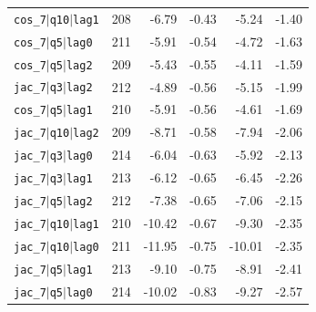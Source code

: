 \begin{longtable}{lrrrrr}
\texttt{cos\_7$\mid$q10$\mid$lag1} & 208 & -6.79 & -0.43 & -5.24 & -1.40 \\
\texttt{cos\_7$\mid$q5$\mid$lag0} & 211 & -5.91 & -0.54 & -4.72 & -1.63 \\
\texttt{cos\_7$\mid$q5$\mid$lag2} & 209 & -5.43 & -0.55 & -4.11 & -1.59 \\
\texttt{jac\_7$\mid$q3$\mid$lag2} & 212 & -4.89 & -0.56 & -5.15 & -1.99 \\
\texttt{cos\_7$\mid$q5$\mid$lag1} & 210 & -5.91 & -0.56 & -4.61 & -1.69 \\
\texttt{jac\_7$\mid$q10$\mid$lag2} & 209 & -8.71 & -0.58 & -7.94 & -2.06 \\
\texttt{jac\_7$\mid$q3$\mid$lag0} & 214 & -6.04 & -0.63 & -5.92 & -2.13 \\
\texttt{jac\_7$\mid$q3$\mid$lag1} & 213 & -6.12 & -0.65 & -6.45 & -2.26 \\
\texttt{jac\_7$\mid$q5$\mid$lag2} & 212 & -7.38 & -0.65 & -7.06 & -2.15 \\
\texttt{jac\_7$\mid$q10$\mid$lag1} & 210 & -10.42 & -0.67 & -9.30 & -2.35 \\
\texttt{jac\_7$\mid$q10$\mid$lag0} & 211 & -11.95 & -0.75 & -10.01 & -2.35 \\
\texttt{jac\_7$\mid$q5$\mid$lag1} & 213 & -9.10 & -0.75 & -8.91 & -2.41 \\
\texttt{jac\_7$\mid$q5$\mid$lag0} & 214 & -10.02 & -0.83 & -9.27 & -2.57 \\
\end{longtable}
